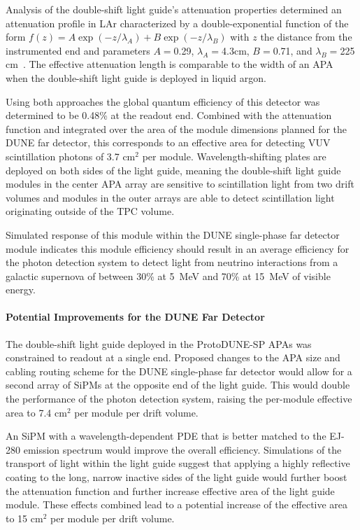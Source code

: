 Analysis of the double-shift light guide's attenuation properties determined 
an attenuation profile in LAr characterized by a double-exponential function
 of the form $f(z) = A \exp(-z/\lambda_{A}) + B \exp(-z/\lambda_B)$ with $z$ 
the distance from the instrumented end and parameters $A = $0.29,
 $\lambda_A = $4.3cm, $B = $0.71, and $\lambda_B = $225 cm~\cite{bib:DoubleShiftLG-NIM-171113}. 
The effective attenuation length is comparable to the width of an APA 
when the double-shift light guide is deployed in liquid argon.

Using both approaches the global quantum efficiency of this detector was 
determined to be 0.48\% at the readout end. Combined with the attenuation 
function and integrated over the area of the module dimensions planned for
 the DUNE far detector, this corresponds to an effective area for detecting
 VUV scintillation photons of 3.7 cm$^{2}$ per module. Wavelength-shifting 
plates are deployed on both sides of the light guide, meaning the double-shift
 light guide modules in the center APA array are sensitive to scintillation 
light from two drift volumes and modules in the outer arrays are able to detect
 scintillation light originating outside of the TPC volume.

Simulated response of this module within the DUNE single-phase far detector module 
indicates this module efficiency should result in an average efficiency for the 
photon detection system to detect light from neutrino interactions from a galactic 
supernova of between 30\% at 5~MeV and 70\% at 15~MeV of visible energy.

\paragraph*{Potential Improvements for the DUNE Far Detector}

The double-shift light guide deployed in the ProtoDUNE-SP APAs was constrained 
to readout at a single end. Proposed changes to the APA size and cabling routing 
scheme for the DUNE single-phase far detector would allow for a second array of 
SiPMs at the opposite end of the light guide. This would double the performance of
 the photon detection system, raising the per-module effective area to 7.4 cm$^{2}$ 
per module per drift volume.

An SiPM with a wavelength-dependent PDE that is better matched to the EJ-280 emission 
spectrum would improve the overall efficiency. Simulations of the transport of light 
within the light guide suggest that applying a highly reflective coating to the long, 
narrow inactive sides of the light guide would further boost the attenuation function
 and further increase effective area of the light guide module. These effects combined 
lead to a potential increase of the effective area to 15 cm$^{2}$ per module per drift volume.

